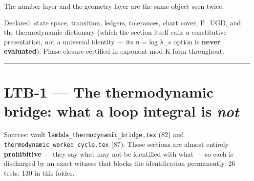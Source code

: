 The number layer and the geometry layer are the same object seen twice.

Declared: state space, transition, ledgers, tolerances, chart cover,
P\_UGD, and the thermodynamic dictionary (which the section itself calls
a constitutive presentation, not a universal identity --- its
σ = log λ\_s option is \textbf{never evaluated}). Phase closure certified in
exponent-mod-K form throughout.

\begin{center}\rule{0.5\linewidth}{0.5pt}\end{center}

\hypertarget{ltb-1-the-thermodynamic-bridge-what-a-loop-integral-is-not}{%
\chapter{\texorpdfstring{LTB-1 --- The thermodynamic bridge: what a loop integral is \emph{not}}{LTB-1 --- The thermodynamic bridge: what a loop integral is not}}\label{ltb-1-the-thermodynamic-bridge-what-a-loop-integral-is-not}}

Sources: vault \texttt{lambda\_thermodynamic\_bridge.tex} (82) and
\texttt{thermodynamic\_worked\_cycle.tex} (87). These sections are almost
entirely \textbf{prohibitive} --- they say what may not be identified with what
--- so each is discharged by an exact witness that blocks the
identification permanently. 26 tests; 130 in this folder.


